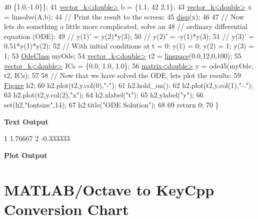 \begin{DoxyCodeInclude}
40                         \{1.0,-1.0\}\};
41     \hyperlink{classkeycpp_1_1vector__k}{vector\_k<double>} b = \{1.1,
42                         2.1\};
43     \hyperlink{classkeycpp_1_1vector__k}{vector\_k<double>} x = linsolve(A,b);
44     \textcolor{comment}{// Print the result to the screen:}
45     \hyperlink{namespacekeycpp_a6a8a286886d48471685b18b7782f1e4a}{disp}(x);
46 
47     \textcolor{comment}{// Now lets do something a little more complicated, solve an}
48     \textcolor{comment}{// ordinary differential equation (ODE):}
49     \textcolor{comment}{// y(1)' = y(2)*y(3);}
50     \textcolor{comment}{// y(2)' = -y(1)*y(3);}
51     \textcolor{comment}{// y(3)' = 0.51*y(1)*y(2);}
52     \textcolor{comment}{// With initial conditions at t = 0: y(1) = 0; y(2) = 1; y(3) = 1;}
53     \hyperlink{class_ode_class}{OdeClass} myOde;
54     \hyperlink{classkeycpp_1_1vector__k}{vector\_k<double>} t2 = \hyperlink{namespacekeycpp_ab690e7da060fb0e4c42e53cf65d76c7a}{linspace}(0.0,12.0,100);
55     \hyperlink{classkeycpp_1_1vector__k}{vector\_k<double>} ICs = \{0.0, 1.0, 1.0\};
56     \hyperlink{classkeycpp_1_1matrix}{matrix<double>} y = ode45(myOde, t2, ICs);
57     
58     \textcolor{comment}{// Now that we have solved the ODE, lets plot the results:}
59     \hyperlink{classkeycpp_1_1_figure}{Figure} h2;
60     h2.plot(t2,y.col(0),\textcolor{stringliteral}{"-"});
61     h2.hold\_on();
62     h2.plot(t2,y.col(1),\textcolor{stringliteral}{"-."});
63     h2.plot(t2,y.col(2),\textcolor{stringliteral}{"x"});
64     h2.xlabel(\textcolor{stringliteral}{"t"});
65     h2.ylabel(\textcolor{stringliteral}{"y"});
66     \textcolor{keyword}{set}(h2,\textcolor{stringliteral}{"fontsize"},14);
67     h2.title(\textcolor{stringliteral}{"ODE Solution"});
68     
69     \textcolor{keywordflow}{return} 0;
70 \}
\end{DoxyCodeInclude}
 \par
 \label{_output}%
 {\bfseries {\ttfamily Text} Output} 
\begin{DoxyCodeInclude}
1 1.76667
2 -0.333333
\end{DoxyCodeInclude}
 \par
 {\bfseries {\ttfamily Plot} Output}  \par
  \par


\section*{M\-A\-T\-L\-A\-B/\-Octave to Key\-Cpp Conversion Chart}

